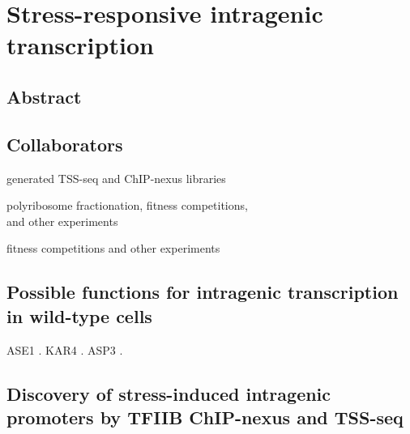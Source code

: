 \chapter{Stress-responsive intragenic transcription}
\label{chapter:stress}

\section{Abstract}

\lipsum[1]

\section{Collaborators}

\begin{description}[align=right, labelwidth=5cm, noitemsep, leftmargin=!]
    \item [Steve Doris] generated TSS-seq and ChIP-nexus libraries
    \item [Dan Spatt] polyribosome fractionation, fitness competitions,\\and other experiments
    \item [James Warner] fitness competitions and other experiments
\end{description}

\section{Possible functions for intragenic transcription in wild-type cells}

ASE1 \citep{mcknight2014}.
KAR4 \citep{gammie1999}.
ASP3 \citep{huang2010}.

\clearpage

\section{Discovery of stress-induced intragenic promoters by TFIIB ChIP-nexus and TSS-seq}


